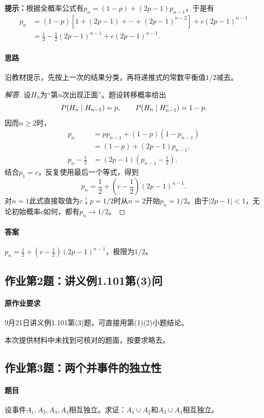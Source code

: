 \textbf{提示：}根据全概率公式有$p_n=(1-p)+(2p-1)p_{n-1}$，于是有
\[
\begin{aligned}
p_n&=(1-p)[1+(2p-1)+\cdots+(2p-1)^{n-2}]+c(2p-1)^{n-1}\\
&=\frac12-\frac12(2p-1)^{n-1}+c(2p-1)^{n-1}.
\end{aligned}
\]
\paragraph{思路}沿教材提示，先按上一次的结果分类，再将递推式的常数平衡值$1/2$减去。
\begin{proof}[解答]
设$H_n$为“第$n$次出现正面”。题设转移概率给出
\[
\P(H_n\mid H_{n-1})=p,\qquad
\P(H_n\mid H_{n-1}^c)=1-p.
\]
因而$n\geq2$时，
\begin{align*}
p_n&=pp_{n-1}+(1-p)(1-p_{n-1})\\
&=(1-p)+(2p-1)p_{n-1},\\
p_n-\frac12&=(2p-1)\left(p_{n-1}-\frac12\right).
\end{align*}
结合$p_1=c$，反复使用最后一个等式，得到
\[
p_n=\frac12+\left(c-\frac12\right)(2p-1)^{n-1}.
\]
对$n=1$此式直接取值为$c$；$p=1/2$时从$n=2$开始$p_n=1/2$。由于$|2p-1|<1$，无论初始概率$c$如何，都有$p_n\to1/2$。
\end{proof}
\paragraph{答案}$p_n=\frac12+(c-\frac12)(2p-1)^{n-1}$，极限为$1/2$。

\subsection{作业第2题：讲义例1.101第(3)问}
\label{ex:w04-h2}
\paragraph{原作业要求}
9月21日讲义例1.101第(3)题，可直接用第(1)(2)小题结论。

本次提供材料中未找到可核对的题面，按要求略去。

\subsection{作业第3题：两个并事件的独立性}
\label{ex:w04-h3}
\paragraph{题目}
设事件$A_1,A_2,A_3,A_4$相互独立。求证：$A_1\cup A_2$和$A_3\cup A_4$相互独立。
